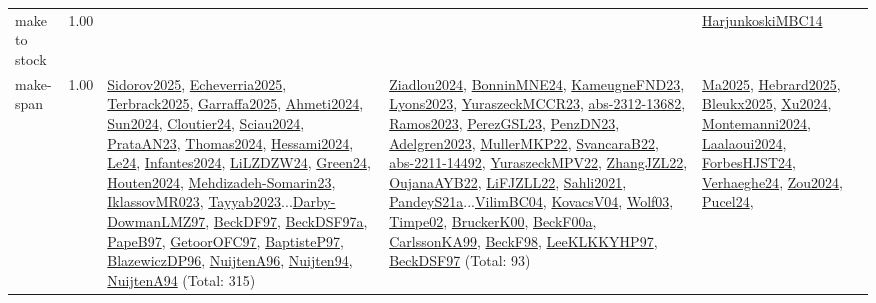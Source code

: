 {\begin{longtable}{p{3cm}r>{\raggedright\arraybackslash}p{6cm}>{\raggedright\arraybackslash}p{6cm}>{\raggedright\arraybackslash}p{8cm}}
\index{make to stock}\index{Concepts!make to stock}make to stock &  1.00 &  &  & \hyperref[detail:HarjunkoskiMBC14]{HarjunkoskiMBC14}\\
\index{make-span}\index{Concepts!make-span}make-span &  1.00 & \hyperref[detail:Sidorov2025]{Sidorov2025}, \hyperref[detail:Echeverria2025]{Echeverria2025}, \hyperref[detail:Terbrack2025]{Terbrack2025}, \hyperref[detail:Garraffa2025]{Garraffa2025}, \hyperref[detail:Ahmeti2024]{Ahmeti2024}, \hyperref[detail:Sun2024]{Sun2024}, \hyperref[detail:Cloutier24]{Cloutier24}, \hyperref[detail:Sciau2024]{Sciau2024}, \hyperref[detail:PrataAN23]{PrataAN23}, \hyperref[detail:Thomas2024]{Thomas2024}, \hyperref[detail:Hessami2024]{Hessami2024}, \hyperref[detail:Le24]{Le24}, \hyperref[detail:Infantes2024]{Infantes2024}, \hyperref[detail:LiLZDZW24]{LiLZDZW24}, \hyperref[detail:Green24]{Green24}, \hyperref[detail:Houten2024]{Houten2024}, \hyperref[detail:Mehdizadeh-Somarin23]{Mehdizadeh-Somarin23}, \hyperref[detail:IklassovMR023]{IklassovMR023}, \hyperref[detail:Tayyab2023]{Tayyab2023}...\hyperref[detail:Darby-DowmanLMZ97]{Darby-DowmanLMZ97}, \hyperref[detail:BeckDF97]{BeckDF97}, \hyperref[detail:BeckDSF97a]{BeckDSF97a}, \hyperref[detail:PapeB97]{PapeB97}, \hyperref[detail:GetoorOFC97]{GetoorOFC97}, \hyperref[detail:BaptisteP97]{BaptisteP97}, \hyperref[detail:BlazewiczDP96]{BlazewiczDP96}, \hyperref[detail:NuijtenA96]{NuijtenA96}, \hyperref[detail:Nuijten94]{Nuijten94}, \hyperref[detail:NuijtenA94]{NuijtenA94} (Total: 315) & \hyperref[detail:Ziadlou2024]{Ziadlou2024}, \hyperref[detail:BonninMNE24]{BonninMNE24}, \hyperref[detail:KameugneFND23]{KameugneFND23}, \hyperref[detail:Lyons2023]{Lyons2023}, \hyperref[detail:YuraszeckMCCR23]{YuraszeckMCCR23}, \hyperref[detail:abs-2312-13682]{abs-2312-13682}, \hyperref[detail:Ramos2023]{Ramos2023}, \hyperref[detail:PerezGSL23]{PerezGSL23}, \hyperref[detail:PenzDN23]{PenzDN23}, \hyperref[detail:Adelgren2023]{Adelgren2023}, \hyperref[detail:MullerMKP22]{MullerMKP22}, \hyperref[detail:SvancaraB22]{SvancaraB22}, \hyperref[detail:abs-2211-14492]{abs-2211-14492}, \hyperref[detail:YuraszeckMPV22]{YuraszeckMPV22}, \hyperref[detail:ZhangJZL22]{ZhangJZL22}, \hyperref[detail:OujanaAYB22]{OujanaAYB22}, \hyperref[detail:LiFJZLL22]{LiFJZLL22}, \hyperref[detail:Sahli2021]{Sahli2021}, \hyperref[detail:PandeyS21a]{PandeyS21a}...\hyperref[detail:VilimBC04]{VilimBC04}, \hyperref[detail:KovacsV04]{KovacsV04}, \hyperref[detail:Wolf03]{Wolf03}, \hyperref[detail:Timpe02]{Timpe02}, \hyperref[detail:BruckerK00]{BruckerK00}, \hyperref[detail:BeckF00a]{BeckF00a}, \hyperref[detail:CarlssonKA99]{CarlssonKA99}, \hyperref[detail:BeckF98]{BeckF98}, \hyperref[detail:LeeKLKKYHP97]{LeeKLKKYHP97}, \hyperref[detail:BeckDSF97]{BeckDSF97} (Total: 93) & \hyperref[detail:Ma2025]{Ma2025}, \hyperref[detail:Hebrard2025]{Hebrard2025}, \hyperref[detail:Bleukx2025]{Bleukx2025}, \hyperref[detail:Xu2024]{Xu2024}, \hyperref[detail:Montemanni2024]{Montemanni2024}, \hyperref[detail:Laalaoui2024]{Laalaoui2024}, \hyperref[detail:ForbesHJST24]{ForbesHJST24}, \hyperref[detail:Verhaeghe24]{Verhaeghe24}, \hyperref[detail:Zou2024]{Zou2024}, \hyperref[detail:Pucel24]{Pucel24}, 
\end{longtable}}
